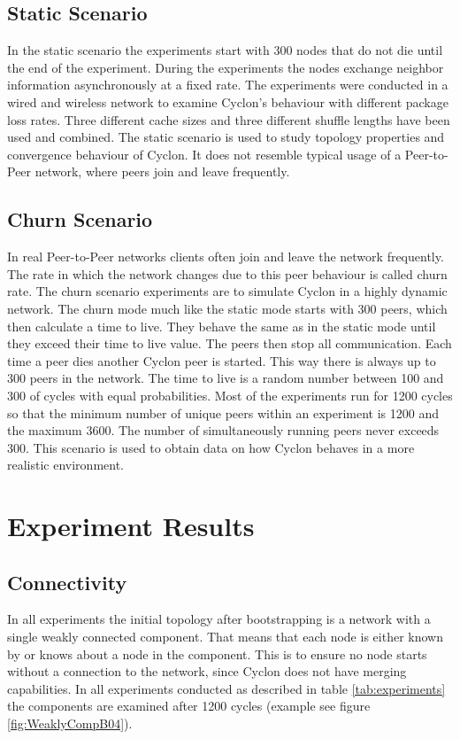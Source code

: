 \subsection{Static Scenario}
In the static scenario the experiments start with 300 nodes that do not die
until the end of the experiment. During the experiments the nodes exchange
neighbor information asynchronously at a fixed rate. The experiments were conducted in a wired and
wireless network to examine Cyclon's behaviour with different package loss
rates. Three different cache sizes and three different shuffle lengths have been
used and combined. The static scenario is used to
study topology properties and convergence behaviour of Cyclon. It
does not resemble typical usage of a Peer-to-Peer network, where peers join and leave frequently.  
\subsection{Churn Scenario}
In real Peer-to-Peer networks clients often join and leave the network
frequently. The rate in which the network changes due to this peer behaviour is
called churn rate. The churn scenario experiments are to simulate Cyclon in a
highly dynamic network. The churn mode much like the static mode starts with 300
peers, which then calculate a time to live. They behave the same as in the
static mode until they exceed their time to live value. The peers then stop all
communication. Each time a peer dies another Cyclon peer is started. This way
there is always up to 300 peers in the network. The time to live is a random
number between 100 and 300 of cycles with equal probabilities. Most of the
experiments run for 1200 cycles so that the minimum number of unique peers
within an experiment is 1200 and the maximum 3600. The number of simultaneously
running peers never exceeds 300. This scenario is used to obtain data on how
Cyclon behaves in a more realistic environment.


\section{Experiment Results}

\subsection{Connectivity}
In all experiments the initial topology after bootstrapping is a network with a
single weakly connected component. That means that each node is either known by
or knows about a node in the component. This is to ensure no node starts
without a connection to the network, since Cyclon does not have merging
capabilities. In all experiments conducted as described in table
\ref{tab:experiments} the components are examined after 1200 cycles (example
see figure \ref{fig:WeaklyCompB04}).\\

